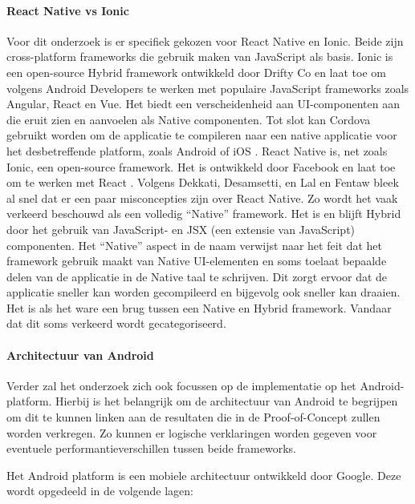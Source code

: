 \paragraph{React Native vs Ionic}
\newline
Voor dit onderzoek is er specifiek gekozen voor React Native en Ionic. Beide zijn cross-platform frameworks die gebruik maken van JavaScript als basis. Ionic is een open-source Hybrid framework ontwikkeld door Drifty Co en laat toe om volgens Android Developers \textcite{Bron8} te werken met populaire JavaScript frameworks zoals Angular, React en Vue. Het biedt een verscheidenheid aan UI-componenten aan die eruit zien en aanvoelen als Native componenten. Tot slot kan Cordova gebruikt worden om de applicatie te compileren naar een native applicatie voor het desbetreffende platform, zoals Android of iOS \autocite{Bron8}.
React Native is, net zoals Ionic, een open-source framework. Het is ontwikkeld door Facebook en laat toe om te werken met React \autocite{Bron1}. Volgens Dekkati, Desamsetti, en Lal \textcite{Bron3} en Fentaw \textcite{Bron2} bleek al snel dat er een paar misconcepties zijn over React Native. Zo wordt het vaak verkeerd beschouwd als een volledig ``Native'' framework. Het is en blijft Hybrid door het gebruik van JavaScript- en JSX (een extensie van JavaScript) componenten. Het ``Native'' aspect in de naam verwijst naar het feit dat het framework gebruik maakt van Native UI-elementen en soms toelaat bepaalde delen van de applicatie in de Native taal te schrijven. Dit zorgt ervoor dat de applicatie sneller kan worden gecompileerd en bijgevolg ook sneller kan draaien. Het is als het ware een brug tussen een Native en Hybrid framework. Vandaar dat dit soms verkeerd wordt gecategoriseerd.

\paragraph{Architectuur van Android}
\newline

Verder zal het onderzoek zich ook focussen op de implementatie op het Android-platform. Hierbij is het belangrijk om de architectuur van Android te begrijpen om dit te kunnen linken aan de resultaten die in de Proof-of-Concept zullen worden verkregen. Zo kunnen er logische verklaringen worden gegeven voor eventuele performantieverschillen tussen beide frameworks.

Het Android platform is een mobiele architectuur ontwikkeld door Google. Deze wordt opgedeeld in de volgende lagen:

